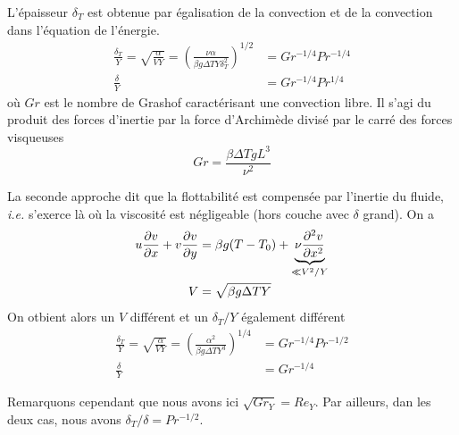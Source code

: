     L'épaisseur $\delta_T$ est obtenue par égalisation de la convection et de la convection dans l'équation de l'énergie.
    \begin{equation}
      \begin{aligned}
        \frac{\delta_T}{Y} = \sqrt{\frac{\alpha}{VY}} = \left(\frac{\nu \alpha}{\beta g \Delta T Y \delta_T^2}\right)^{1/2} &= Gr^{-1/4} Pr^{-1/4}\\
        \frac{\delta}{Y} &= Gr^{-1/4}Pr^{1/4}
      \end{aligned}
    \end{equation}
    où $Gr$ est le nombre de Grashof caractérisant une convection libre. Il s'agi du produit des forces d'inertie par la force d'Archimède divisé par le carré des forces visqueuses
    \begin{equation}
      Gr = \frac{\beta \Delta T g L^3}{\nu^2}
    \end{equation}

    La seconde approche dit que la flottabilité est compensée par l'inertie du fluide, \textit{i.e.} s'exerce là où la viscosité est négligeable (hors couche avec $\delta$ grand). On a
    \begin{equation}
      \begin{aligned}
        u\pdv{v}{x} + v\pdv{v}{y} &= \beta g (T-T_0) + \underbrace{\nu \pdv[2]{v}{x}}_{\ll V^2/Y}\\
        V &= \sqrt{\beta g \Delta T Y}
      \end{aligned}
    \end{equation}
    On otbient alors un $V$ différent et un $\delta_T/Y$ également différent
    \begin{equation}
      \begin{aligned}
        \frac{\delta_T}{Y} = \sqrt{\frac{\alpha}{VY}} = \left(\frac{\alpha^2}{\beta g\Delta T Y^3}\right)^{1/4} &= Gr^{-1/4} Pr^{-1/2}\\
        \frac{\delta}{Y} &= Gr^{-1/4}
      \end{aligned}
    \end{equation}

    Remarquons cependant que nous avons ici $\sqrt{Gr_Y} = Re_Y$. Par ailleurs, dan les deux cas, nous avons $\delta_T/\delta = Pr^{-1/2}$.

